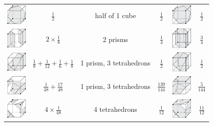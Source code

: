 \documentclass[11pt]{article}
\begin{document}
\begin{table}[]
\begin{tabular}{c|c|c|c|c|c}
        \includegraphics[width=1cm]{Figures/case 10.png} & $\frac{1}{2}$ & half of 1 cube & $\frac{1}{2}$ & \includegraphics[width=1cm]{Figures/case 25.png} & $\frac{1}{2}$ \\

        \includegraphics[width=1cm]{Figures/case 11.png} & $2 \times \frac{1}{8}$ & 2 prisms & $\frac{1}{4}$ & \includegraphics[width=1cm]{Figures/case 26.png} & $\frac{3}{4}$ \\

        \includegraphics[width=1cm]{Figures/case 12.png} & $\frac{1}{8} + \frac{1}{12} + \frac{1}{6} + \frac{1}{8}$ & 1 prism, 3 tetrahedrons & $\frac{1}{2}$ & \includegraphics[width=1cm]{Figures/case 27.png} & $\frac{1}{2}$ \\

        \includegraphics[width=1cm]{Figures/case 13.png} & $\frac{1}{48} + \frac{17}{48}$ &1 prism, 3 tetrahedrons& $\frac{139}{144}$ & \includegraphics[width=1cm]{Figures/case 28.png} & $\frac{5}{144}$ \\

        \includegraphics[width=1cm]{Figures/case 14.png} & $4 \times \frac{1}{48}$ & 4 tetrahedrons & $\frac{1}{12}$ & \includegraphics[width=1cm]{Figures/case 29.png} & $\frac{11}{12}$\\


\end{tabular}
\end{table}
\end{document}
